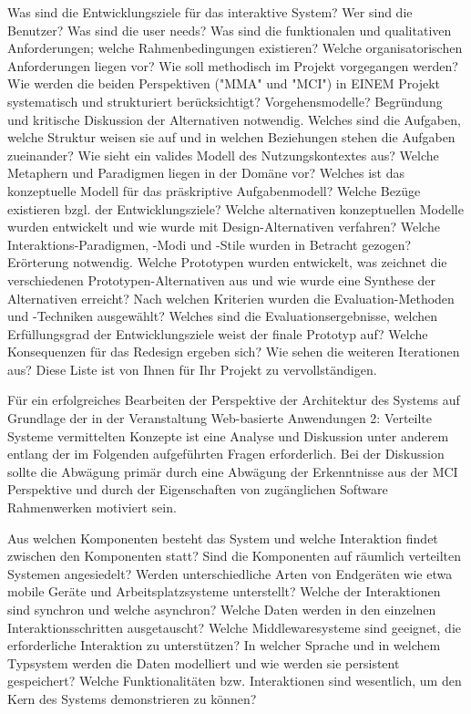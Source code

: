 Was sind die Entwicklungsziele für das interaktive System?
Wer sind die Benutzer?
Was sind die user needs?
Was sind die funktionalen und qualitativen Anforderungen; welche Rahmenbedingungen existieren?
Welche organisatorischen Anforderungen liegen vor?
Wie soll methodisch im Projekt vorgegangen werden? Wie werden die beiden Perspektiven ("MMA" und "MCI") in EINEM Projekt systematisch und strukturiert berücksichtigt? Vorgehensmodelle? Begründung und kritische Diskussion der Alternativen notwendig.
Welches sind die Aufgaben, welche Struktur weisen sie auf und in welchen Beziehungen stehen die Aufgaben zueinander?
Wie sieht ein valides Modell des Nutzungskontextes aus?
Welche Metaphern und Paradigmen liegen in der Domäne vor?
Welches ist das konzeptuelle Modell für das präskriptive Aufgabenmodell? Welche Bezüge existieren bzgl. der Entwicklungsziele?
Welche alternativen konzeptuellen Modelle wurden entwickelt und wie wurde mit Design-Alternativen verfahren?
Welche Interaktions-Paradigmen, -Modi und -Stile wurden in Betracht gezogen? Erörterung notwendig.
Welche Prototypen wurden entwickelt, was zeichnet die verschiedenen Prototypen-Alternativen aus und wie wurde eine Synthese der Alternativen erreicht?
Nach welchen Kriterien wurden die Evaluation-Methoden und -Techniken ausgewählt?
Welches sind die Evaluationsergebnisse, welchen Erfüllungsgrad der Entwicklungsziele weist der finale Prototyp auf?
Welche Konsequenzen für das Redesign ergeben sich?
Wie sehen die weiteren Iterationen aus?
Diese Liste ist von Ihnen für Ihr Projekt zu vervollständigen.	

Für ein erfolgreiches Bearbeiten der Perspektive der Architektur des Systems auf Grundlage der in der Veranstaltung Web-basierte Anwendungen 2: Verteilte Systeme vermittelten Konzepte ist eine Analyse und Diskussion unter anderem entlang der im Folgenden aufgeführten Fragen erforderlich. Bei der Diskussion sollte die Abwägung primär durch eine Abwägung der Erkenntnisse aus der MCI Perspektive und durch der Eigenschaften von zugänglichen Software Rahmenwerken motiviert sein.

Aus welchen Komponenten besteht das System und welche Interaktion findet zwischen den Komponenten statt?
Sind die Komponenten auf räumlich verteilten Systemen angesiedelt?
Werden unterschiedliche Arten von Endgeräten wie etwa mobile Geräte und Arbeitsplatzsysteme unterstellt?
Welche der Interaktionen sind synchron und welche asynchron?
Welche Daten werden in den einzelnen Interaktionsschritten ausgetauscht?
Welche Middlewaresysteme sind geeignet, die erforderliche Interaktion zu unterstützen?
In welcher Sprache und in welchem Typsystem werden die Daten modelliert und wie werden sie persistent gespeichert?
Welche Funktionalitäten bzw. Interaktionen sind wesentlich, um den Kern des Systems demonstrieren zu können?

